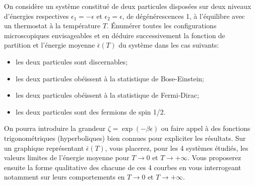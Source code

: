 On considère un système constitué de deux particules disposées sur deux niveaux d'énergies respectives $\epsilon_1=-\epsilon$ et $\epsilon_2=\epsilon$, de dégénérescences 1, à  l'équilibre avec un thermostat à  la température $T$.
\'Enumérer toutes les configurations microscopiques envisageables et en déduire successivement la fonction de partition et l'énergie moyenne $\bar{\epsilon}(T)$ du système dans les cas suivants:
\begin{itemize}
\item les deux particules sont discernables;
\item les deux particules obéissent à  la statistique de Bose-Einstein;
\item les deux particules obéissent à  la statistique de Fermi-Dirac;
\item les deux particules sont des fermions de spin 1/2.
\end{itemize}
On pourra introduire la grandeur $\zeta=\exp(-\beta \epsilon)$ ou faire appel à  des fonctions trigonométriques (hyperboliques) bien connues pour expliciter les résultats. Sur un graphique représentant $\bar{\epsilon} (T)$, vous placerez, pour les 4 systèmes étudiés, les valeurs limites de l'énergie moyenne pour $T \rightarrow 0$ et $T \rightarrow +\infty$. Vous proposerez ensuite la forme qualitative des chacune de ces 4 courbes en vous interrogeant notamment sur leurs comportements en $T \rightarrow 0$ et $T \rightarrow +\infty$.
